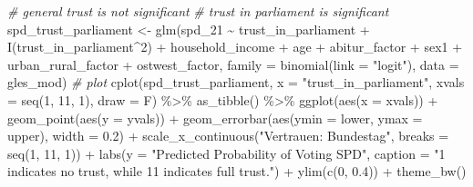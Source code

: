 \documentclass[
]{article}
\newenvironment{Shaded}{\begin{snugshade}}{\end{snugshade}}
\newcommand{\AttributeTok}[1]{\textcolor[rgb]{0.77,0.63,0.00}{#1}}
\newcommand{\CommentTok}[1]{\textcolor[rgb]{0.56,0.35,0.01}{\textit{#1}}}
\newcommand{\DecValTok}[1]{\textcolor[rgb]{0.00,0.00,0.81}{#1}}
\newcommand{\FloatTok}[1]{\textcolor[rgb]{0.00,0.00,0.81}{#1}}
\newcommand{\FunctionTok}[1]{\textcolor[rgb]{0.00,0.00,0.00}{#1}}
\newcommand{\NormalTok}[1]{#1}
\newcommand{\OtherTok}[1]{\textcolor[rgb]{0.56,0.35,0.01}{#1}}
\newcommand{\SpecialCharTok}[1]{\textcolor[rgb]{0.00,0.00,0.00}{#1}}
\newcommand{\StringTok}[1]{\textcolor[rgb]{0.31,0.60,0.02}{#1}}
\begin{document}
\begin{Shaded}
\begin{Highlighting}[]
\CommentTok{\# general trust is not significant }
\CommentTok{\# trust in parliament is significant }
\NormalTok{spd\_trust\_parliament }\OtherTok{\textless{}{-}} \FunctionTok{glm}\NormalTok{(spd\_21 }\SpecialCharTok{\textasciitilde{}}\NormalTok{ trust\_in\_parliament }\SpecialCharTok{+} \FunctionTok{I}\NormalTok{(trust\_in\_parliament}\SpecialCharTok{\^{}}\DecValTok{2}\NormalTok{) }\SpecialCharTok{+}\NormalTok{ household\_income }\SpecialCharTok{+}\NormalTok{ age }\SpecialCharTok{+}\NormalTok{ abitur\_factor }\SpecialCharTok{+}\NormalTok{ sex1 }\SpecialCharTok{+}\NormalTok{ urban\_rural\_factor }\SpecialCharTok{+}\NormalTok{ ostwest\_factor, }\AttributeTok{family =} \FunctionTok{binomial}\NormalTok{(}\AttributeTok{link =} \StringTok{"logit"}\NormalTok{), }\AttributeTok{data =}\NormalTok{ gles\_mod)}
\CommentTok{\# plot }
\FunctionTok{cplot}\NormalTok{(spd\_trust\_parliament, }\AttributeTok{x =} \StringTok{"trust\_in\_parliament"}\NormalTok{, }
      \AttributeTok{xvals =} \FunctionTok{seq}\NormalTok{(}\DecValTok{1}\NormalTok{, }\DecValTok{11}\NormalTok{, }\DecValTok{1}\NormalTok{), }\AttributeTok{draw =}\NormalTok{ F) }\SpecialCharTok{\%\textgreater{}\%}
  \FunctionTok{as\_tibble}\NormalTok{() }\SpecialCharTok{\%\textgreater{}\%}
  \FunctionTok{ggplot}\NormalTok{(}\FunctionTok{aes}\NormalTok{(}\AttributeTok{x =}\NormalTok{ xvals)) }\SpecialCharTok{+}
  \FunctionTok{geom\_point}\NormalTok{(}\FunctionTok{aes}\NormalTok{(}\AttributeTok{y =}\NormalTok{ yvals)) }\SpecialCharTok{+}
  \FunctionTok{geom\_errorbar}\NormalTok{(}\FunctionTok{aes}\NormalTok{(}\AttributeTok{ymin =}\NormalTok{ lower, }\AttributeTok{ymax =}\NormalTok{ upper), }\AttributeTok{width =} \FloatTok{0.2}\NormalTok{) }\SpecialCharTok{+}
  \FunctionTok{scale\_x\_continuous}\NormalTok{(}\StringTok{"Vertrauen: Bundestag"}\NormalTok{, }
                     \AttributeTok{breaks =} \FunctionTok{seq}\NormalTok{(}\DecValTok{1}\NormalTok{, }\DecValTok{11}\NormalTok{, }\DecValTok{1}\NormalTok{)) }\SpecialCharTok{+}
  \FunctionTok{labs}\NormalTok{(}\AttributeTok{y =} \StringTok{"Predicted Probability of Voting SPD"}\NormalTok{, }
       \AttributeTok{caption =} \StringTok{"\textquotesingle{}1\textquotesingle{} indicates \textquotesingle{}no trust\textquotesingle{}, while 11 indicates \textquotesingle{}full trust\textquotesingle{}."}\NormalTok{) }\SpecialCharTok{+}
  \FunctionTok{ylim}\NormalTok{(}\FunctionTok{c}\NormalTok{(}\DecValTok{0}\NormalTok{, }\FloatTok{0.4}\NormalTok{)) }\SpecialCharTok{+}
  \FunctionTok{theme\_bw}\NormalTok{()}
\end{Highlighting}
\end{Shaded}
\end{document}
